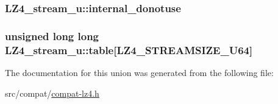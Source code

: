 \subsubsection[{internal\+\_\+donotuse}]{ L\+Z4\+\_\+stream\+\_\+u\+::internal\+\_\+donotuse}\label{union_l_z4__stream__u_a0791f2829d7100e12eb5f99094d8855e}
\hypertarget{union_l_z4__stream__u_adb230dc14b94f45f65fe5dcf2f4923cc}{}
\subsubsection[{table}]{\setlength{\rightskip}{0pt plus 5cm}unsigned long long L\+Z4\+\_\+stream\+\_\+u\+::table\mbox{[}{\bf L\+Z4\+\_\+\+S\+T\+R\+E\+A\+M\+S\+I\+Z\+E\+\_\+\+U64}\mbox{]}}\label{union_l_z4__stream__u_adb230dc14b94f45f65fe5dcf2f4923cc}


The documentation for this union was generated from the following file\+:\begin{DoxyCompactItemize}
\item 
src/compat/\hyperlink{compat-lz4_8h}{compat-\/lz4.\+h}\end{DoxyCompactItemize}
